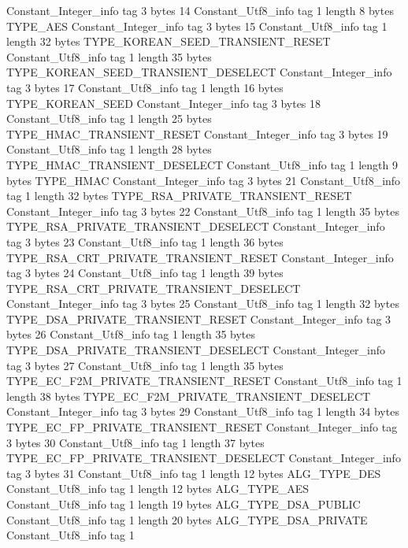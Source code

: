 {{{		}
		Constant_Integer_info {
			tag	3
			bytes	14
		}
		Constant_Utf8_info {
			tag	1
			length	8
			bytes	TYPE_AES
		}
		Constant_Integer_info {
			tag	3
			bytes	15
		}
		Constant_Utf8_info {
			tag	1
			length	32
			bytes	TYPE_KOREAN_SEED_TRANSIENT_RESET
		}
		Constant_Utf8_info {
			tag	1
			length	35
			bytes	TYPE_KOREAN_SEED_TRANSIENT_DESELECT
		}
		Constant_Integer_info {
			tag	3
			bytes	17
		}
		Constant_Utf8_info {
			tag	1
			length	16
			bytes	TYPE_KOREAN_SEED
		}
		Constant_Integer_info {
			tag	3
			bytes	18
		}
		Constant_Utf8_info {
			tag	1
			length	25
			bytes	TYPE_HMAC_TRANSIENT_RESET
		}
		Constant_Integer_info {
			tag	3
			bytes	19
		}
		Constant_Utf8_info {
			tag	1
			length	28
			bytes	TYPE_HMAC_TRANSIENT_DESELECT
		}
		Constant_Utf8_info {
			tag	1
			length	9
			bytes	TYPE_HMAC
		}
		Constant_Integer_info {
			tag	3
			bytes	21
		}
		Constant_Utf8_info {
			tag	1
			length	32
			bytes	TYPE_RSA_PRIVATE_TRANSIENT_RESET
		}
		Constant_Integer_info {
			tag	3
			bytes	22
		}
		Constant_Utf8_info {
			tag	1
			length	35
			bytes	TYPE_RSA_PRIVATE_TRANSIENT_DESELECT
		}
		Constant_Integer_info {
			tag	3
			bytes	23
		}
		Constant_Utf8_info {
			tag	1
			length	36
			bytes	TYPE_RSA_CRT_PRIVATE_TRANSIENT_RESET
		}
		Constant_Integer_info {
			tag	3
			bytes	24
		}
		Constant_Utf8_info {
			tag	1
			length	39
			bytes	TYPE_RSA_CRT_PRIVATE_TRANSIENT_DESELECT
		}
		Constant_Integer_info {
			tag	3
			bytes	25
		}
		Constant_Utf8_info {
			tag	1
			length	32
			bytes	TYPE_DSA_PRIVATE_TRANSIENT_RESET
		}
		Constant_Integer_info {
			tag	3
			bytes	26
		}
		Constant_Utf8_info {
			tag	1
			length	35
			bytes	TYPE_DSA_PRIVATE_TRANSIENT_DESELECT
		}
		Constant_Integer_info {
			tag	3
			bytes	27
		}
		Constant_Utf8_info {
			tag	1
			length	35
			bytes	TYPE_EC_F2M_PRIVATE_TRANSIENT_RESET
		}
		Constant_Utf8_info {
			tag	1
			length	38
			bytes	TYPE_EC_F2M_PRIVATE_TRANSIENT_DESELECT
		}
		Constant_Integer_info {
			tag	3
			bytes	29
		}
		Constant_Utf8_info {
			tag	1
			length	34
			bytes	TYPE_EC_FP_PRIVATE_TRANSIENT_RESET
		}
		Constant_Integer_info {
			tag	3
			bytes	30
		}
		Constant_Utf8_info {
			tag	1
			length	37
			bytes	TYPE_EC_FP_PRIVATE_TRANSIENT_DESELECT
		}
		Constant_Integer_info {
			tag	3
			bytes	31
		}
		Constant_Utf8_info {
			tag	1
			length	12
			bytes	ALG_TYPE_DES
		}
		Constant_Utf8_info {
			tag	1
			length	12
			bytes	ALG_TYPE_AES
		}
		Constant_Utf8_info {
			tag	1
			length	19
			bytes	ALG_TYPE_DSA_PUBLIC
		}
		Constant_Utf8_info {
			tag	1
			length	20
			bytes	ALG_TYPE_DSA_PRIVATE
		}
		Constant_Utf8_info {
			tag	1
}}}
